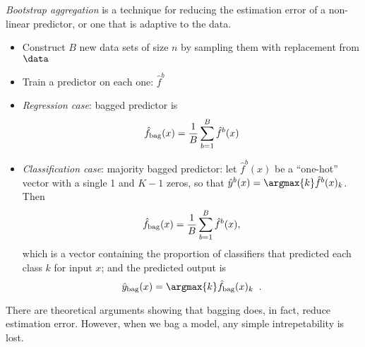 {\em Bootstrap aggregation} is a technique for reducing the estimation error
of a non-linear predictor, or one that is adaptive to the data.
\begin{itemize}
\item Construct $B$ new data sets of size $n$ by sampling them with
  replacement from $\data$
\item Train a predictor on each one:  $\hat{f}^b$
\item {\em Regression case}:  bagged predictor is
  \begin{equation}
    \hat{f}_{\rm bag}(x) = \frac{1}{B} \sum_{b=1}^B \hat{f}^b(x)
    \end{equation}

\item {\em Classification case}:  majority bagged predictor:  let
  $\hat{f}^b(x)$ be a ``one-hot'' vector with a single 1 and $K-1$ zeros, so that
  $\hat{y}^b(x) = \argmax{k} \hat{f}^b(x)_k$.  Then 
  \begin{equation}
    \hat{f}_{\rm bag}(x) = \frac{1}{B} \sum_{b=1}^B \hat{f}^b(x),
    \end{equation}
which is a vector containing the proportion of classifiers that
predicted each class $k$ for input $x$;  and the predicted output is 
\begin{equation}
  \hat{y}_{\rm bag}(x) = \argmax{k} \hat{f}_{\rm bag}(x)_k\;\;.
  \end{equation}

\end{itemize}

There are theoretical arguments showing that bagging does, in fact,
reduce estimation error.
However, when we bag a model, any simple intrepetability is lost.

